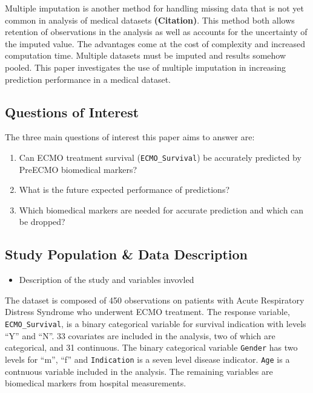 \documentclass[12pt,]{article}
\providecommand{\tightlist}{%
  \setlength{\itemsep}{0pt}\setlength{\parskip}{0pt}}
\begin{document}
Multiple imputation is another method for handling missing data that is
not yet common in analysis of medical datasets \textbf{(Citation)}. This
method both allows retention of observations in the analysis as well as
accounts for the uncertainty of the imputed value. The advantages come
at the cost of complexity and increased computation time. Multiple
datasets must be imputed and results somehow pooled. This paper
investigates the use of multiple imputation in increasing prediction
performance in a medical dataset.

\subsection{Questions of Interest}\label{questions-of-interest}

The three main questions of interest this paper aims to answer are:

\begin{enumerate}
\def\labelenumi{\arabic{enumi}.}
\tightlist
\item
  Can ECMO treatment survival (\texttt{ECMO\_Survival}) be accurately
  predicted by PreECMO biomedical markers?
\item
  What is the future expected performance of predictions?
\item
  Which biomedical markers are needed for accurate prediction and which
  can be dropped?
\end{enumerate}

\subsection{Study Population \& Data
Description}\label{study-population-data-description}

\begin{itemize}
\tightlist
\item
  Description of the study and variables invovled
\end{itemize}

The dataset is composed of 450 observations on patients with Acute
Respiratory Distress Syndrome who underwent ECMO treatment. The response
variable, \texttt{ECMO\_Survival}, is a binary categorical variable for
survival indication with levels ``Y'' and ``N''. 33 covariates are
included in the analysis, two of which are categorical, and 31
continuous. The binary categorical variable \texttt{Gender} has two
levels for ``m'', ``f'' and \texttt{Indication} is a seven level disease
indicator. \texttt{Age} is a contnuous variable included in the
analysis. The remaining variables are biomedical markers from hospital
measurements.
\end{document}
